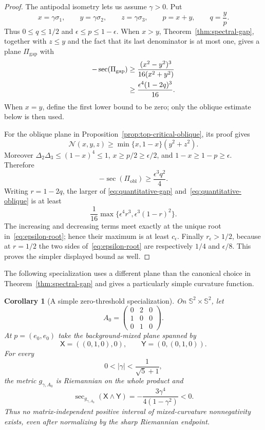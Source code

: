 \documentclass[11pt]{amsart}
\newtheorem{corollary}[theorem]{Corollary}
\theoremstyle{definition}
\theoremstyle{remark}
\DeclareMathOperator{\secop}{sec}
\newcommand{\Sph}{\mathbb S}
\begin{document}
\begin{proof}
The antipodal isometry lets us assume $\gamma>0$.  Put
\[
 x=\gamma\sigma_1,\qquad y=\gamma\sigma_2,
 \qquad z=\gamma\sigma_3,\qquad p=x+y,\qquad q=\frac yp.
\]
Thus $0\leq q\leq1/2$ and $\epsilon\leq p\leq1-\epsilon$.
When $x>y$, Theorem~\ref{thm:spectral-gap}, together with
$z\leq y$ and the fact that its last denominator is at most one,
gives a plane $\Pi_{\mathrm{gap}}$ with
\begin{align}
 -\secop(\Pi_{\mathrm{gap}})
 &\geq\frac{(x^2-y^2)^3}{16(x^2+y^2)}\notag\\
 &\geq\frac{\epsilon^4(1-2q)^3}{16}.
 \label{eq:quantitative-gap}
\end{align}
When $x=y$, define the first lower bound to be zero; only the oblique
estimate below is then used.

For the oblique plane in Proposition~\ref{prop:top-critical-oblique},
its proof gives
\[
 \mathcal N(x,y,z)\geq\min\{x,1-x\}(y^2+z^2).
\]
Moreover $\Delta_2\Delta_3\leq(1-x)^4\leq1$,
$x\geq p/2\geq\epsilon/2$, and
$1-x\geq1-p\geq\epsilon$.  Therefore
\begin{equation}\label{eq:quantitative-oblique}
 -\secop(\Pi_{\mathrm{obl}})
 \geq\frac{\epsilon^3q^2}{4}.
\end{equation}
Writing $r=1-2q$, the larger of
\eqref{eq:quantitative-gap} and~\eqref{eq:quantitative-oblique} is at
least
\[
 \frac1{16}\max\{\epsilon^4r^3,
                         \epsilon^3(1-r)^2\}.
\]
The increasing and decreasing terms meet exactly at the unique root
in~\eqref{eq:epsilon-root}; hence their maximum is at least
$c_\epsilon$.  Finally $r_\epsilon>1/2$, because at $r=1/2$ the two
sides of~\eqref{eq:epsilon-root} are respectively $1/4$ and
$\epsilon/8$.  This proves the simpler displayed bound as well.
\end{proof}

The following specialization uses a different plane than the canonical
choice in Theorem~\ref{thm:spectral-gap} and gives a particularly simple
curvature function.

\begin{corollary}[A simple zero-threshold specialization]
\label{cor:zero-threshold}
On $\Sph^2\times\Sph^2$, let
\[
 A_0=\begin{pmatrix}0&2&0\\1&0&0\\0&1&0\end{pmatrix}.
\]
At $p=(e_0,e_0)$ take the background-mixed plane spanned by
\[
 \mathsf X=((0,1,0),0),\qquad
 \mathsf Y=(0,(0,1,0)).
\]
For every
\[
 0<\lvert\gamma\rvert<\frac1{\sqrt5+1},
\]
the metric $g_{\gamma,A_0}$ is Riemannian on the whole product and
\begin{equation}\label{eq:negative-all-small}
 \secop_{g_{\gamma,A_0}}(\mathsf X\wedge\mathsf Y)
 =-\frac{3\gamma^4}{4(1-\gamma^2)}<0.
\end{equation}
Thus no matrix-independent positive interval of mixed-curvature
nonnegativity exists, even after normalizing by the sharp Riemannian
endpoint.
\end{corollary}
\end{document}

